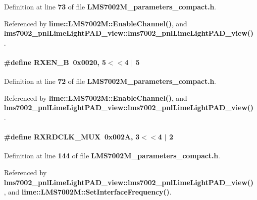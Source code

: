Definition at line {\bf 73} of file {\bf L\+M\+S7002\+M\+\_\+parameters\+\_\+compact.\+h}.



Referenced by {\bf lime\+::\+L\+M\+S7002\+M\+::\+Enable\+Channel()}, and {\bf lms7002\+\_\+pnl\+Lime\+Light\+P\+A\+D\+\_\+view\+::lms7002\+\_\+pnl\+Lime\+Light\+P\+A\+D\+\_\+view()}.

\paragraph[{R\+X\+E\+N\+\_\+B}]{\setlength{\rightskip}{0pt plus 5cm}\#define R\+X\+E\+N\+\_\+B~0x0020, 5$<$$<$4 $\vert$  5}\label{LMS7002M__parameters__compact_8h_af626fe568d417fb41a6d55b1a4a4d175}


Definition at line {\bf 72} of file {\bf L\+M\+S7002\+M\+\_\+parameters\+\_\+compact.\+h}.



Referenced by {\bf lime\+::\+L\+M\+S7002\+M\+::\+Enable\+Channel()}, and {\bf lms7002\+\_\+pnl\+Lime\+Light\+P\+A\+D\+\_\+view\+::lms7002\+\_\+pnl\+Lime\+Light\+P\+A\+D\+\_\+view()}.

\paragraph[{R\+X\+R\+D\+C\+L\+K\+\_\+\+M\+UX}]{\setlength{\rightskip}{0pt plus 5cm}\#define R\+X\+R\+D\+C\+L\+K\+\_\+\+M\+UX~0x002\+A, 3$<$$<$4 $\vert$  2}\label{LMS7002M__parameters__compact_8h_a6ed3b2e3c0f899a7cd6bbcbd54c12bcd}


Definition at line {\bf 144} of file {\bf L\+M\+S7002\+M\+\_\+parameters\+\_\+compact.\+h}.



Referenced by {\bf lms7002\+\_\+pnl\+Lime\+Light\+P\+A\+D\+\_\+view\+::lms7002\+\_\+pnl\+Lime\+Light\+P\+A\+D\+\_\+view()}, and {\bf lime\+::\+L\+M\+S7002\+M\+::\+Set\+Interface\+Frequency()}.

